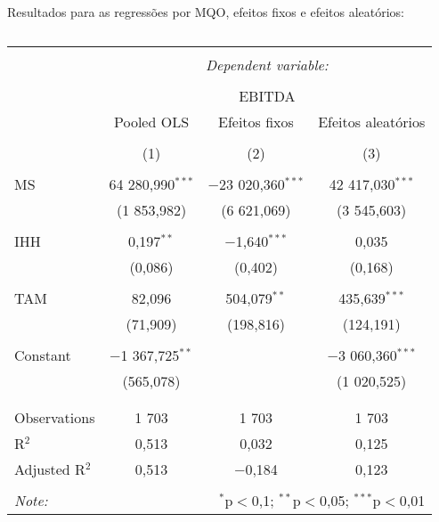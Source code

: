 \documentclass[
]{article}
\begin{document}
Resultados para as regressões por MQO, efeitos fixos e efeitos aleatórios:

\begin{table}[!htbp] \centering 
  \caption{} 
  \label{} 
\begin{tabular}{@{\extracolsep{5pt}}lccc} 
\\[-1.8ex]\hline 
\hline \\[-1.8ex] 
 & \multicolumn{3}{c}{\textit{Dependent variable:}} \\ 
\cline{2-4} 
\\[-1.8ex] & \multicolumn{3}{c}{EBITDA} \\ 
 & Pooled OLS & Efeitos fixos & Efeitos aleatórios \\ 
\\[-1.8ex] & (1) & (2) & (3)\\ 
\hline \\[-1.8ex] 
 MS & 64 280,990$^{***}$ & $-$23 020,360$^{***}$ & 42 417,030$^{***}$ \\ 
  & (1 853,982) & (6 621,069) & (3 545,603) \\ 
  & & & \\ 
 IHH & 0,197$^{**}$ & $-$1,640$^{***}$ & 0,035 \\ 
  & (0,086) & (0,402) & (0,168) \\ 
  & & & \\ 
 TAM & 82,096 & 504,079$^{**}$ & 435,639$^{***}$ \\ 
  & (71,909) & (198,816) & (124,191) \\ 
  & & & \\ 
 Constant & $-$1 367,725$^{**}$ &  & $-$3 060,360$^{***}$ \\ 
  & (565,078) &  & (1 020,525) \\ 
  & & & \\ 
\hline \\[-1.8ex] 
Observations & 1 703 & 1 703 & 1 703 \\ 
R$^{2}$ & 0,513 & 0,032 & 0,125 \\ 
Adjusted R$^{2}$ & 0,513 & $-$0,184 & 0,123 \\ 
\hline 
\hline \\[-1.8ex] 
\textit{Note:}  & \multicolumn{3}{r}{$^{*}$p$<$0,1; $^{**}$p$<$0,05; $^{***}$p$<$0,01} \\ 
\end{tabular} 
\end{table}

\renewcommand\refname{References}
  
\end{document}
